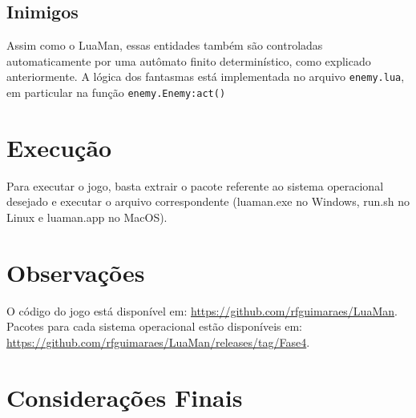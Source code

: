 \documentclass[a4paper]{scrartcl}
\begin{document}
\subsection{Inimigos}

Assim como o LuaMan, essas entidades também são controladas automaticamente por uma autômato finito determinístico,
como explicado anteriormente. A lógica dos fantasmas está implementada no arquivo \texttt{enemy.lua}, em particular na função
\texttt{enemy.Enemy:act()}

\section{Execução}

Para executar o jogo, basta extrair o pacote referente ao sistema operacional desejado e executar o
arquivo correspondente (luaman.exe no Windows, run.sh no Linux e luaman.app no MacOS).

\section{Observações}

O código do jogo está disponível em: \url{https://github.com/rfguimaraes/LuaMan}.
Pacotes para cada sistema operacional estão disponíveis em: \url{https://github.com/rfguimaraes/LuaMan/releases/tag/Fase4}.

\section{Considerações Finais}

%
\end{document}
